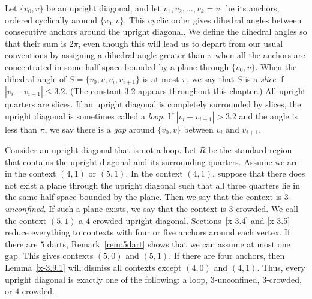 \begin{definition}
Let $\{v_0,v\}$ be an upright diagonal, and let
$v_1,v_2,\ldots,v_k=v_1$ be its anchors, ordered cyclically around
$\{v_0,v\}$.  This cyclic order gives dihedral angles between
consecutive anchors around the upright diagonal. We define the
dihedral angles so that their sum is $2\pi$, even though this will
lead us to depart from our usual conventions by assigning a
dihedral angle greater than $\pi$ when all the anchors are
concentrated in some half-space bounded by a plane through
$\{v_0,v\}$. When the dihedral angle of $S=\{v_0,v,v_i,v_{i+1}\}$ is at
most $\pi$, we say that $S$ is a {\it slice\/} if
$|v_i-v_{i+1}|\le3.2$. (The constant $3.2$ appears throughout this
chapter.) All upright quarters are slices. If an upright
diagonal is completely surrounded by slices, the
upright diagonal is sometimes called a {\it loop}. If
$|v_i-v_{i+1}|>3.2$ and the angle is less than $\pi$, we say there
is a {\it gap\/} around $\{v_0,v\}$ between $v_i$ and $v_{i+1}$.
\end{definition}

\begin{definition}
Consider an upright diagonal that is not a loop. Let $R$ be the
standard region that contains the upright diagonal and its
surrounding quarters.  Assume we are in the context $(4,1)$ or
$(5,1)$.  In the context $(4,1)$, suppose that there does not exist
a plane through the upright diagonal such that all three quarters
lie in the same half-space bounded by the plane. Then we say that
the context is {\it $3$-unconfined}. If such a plane exists, we say
that the context is $3$-crowded. We call the context $(5,1)$ a
$4$-crowded upright diagonal. Sections~\ref{x-3.4} and \ref{x-3.5}
reduce everything to contexts with four or five anchors around each
vertex.  If there are $5$ darts, 
Remark~\ref{rem:5dart} shows that we can assume at most one
gap. This gives contexts $(5,0)$ and $(5,1)$.  If there are four
anchors, then Lemma~\ref{x-3.9.1} will dismiss all contexts except
$(4,0)$ and $(4,1)$. Thus, every upright diagonal is exactly one of
the following: a loop, $3$-unconfined, $3$-crowded, or $4$-crowded.
\end{definition}

